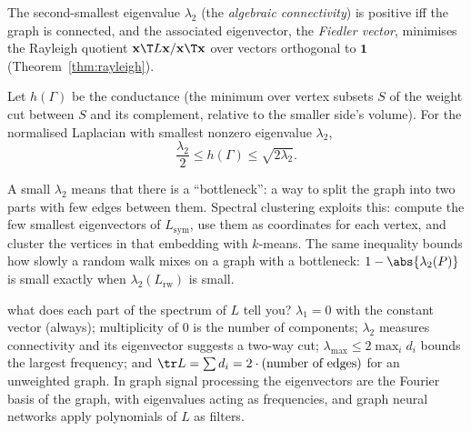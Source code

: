 The second-smallest eigenvalue $\lambda_2$ (the \emph{algebraic connectivity}) is positive iff the graph is connected, and the associated eigenvector, the \emph{Fiedler vector}, minimises the Rayleigh quotient $\mathbf{x}\T L\mathbf{x}/\mathbf{x}\T\mathbf{x}$ over vectors orthogonal to $\mathbf{1}$ (Theorem~\ref{thm:rayleigh}).

\begin{theorem}\label{thm:cheeger}
Let $h(\Gamma)$ be the conductance (the minimum over vertex subsets $S$ of the weight cut between $S$ and its complement, relative to the smaller side's volume). For the normalised Laplacian with smallest nonzero eigenvalue $\lambda_2$,
\[ \frac{\lambda_2}2\le h(\Gamma)\le\sqrt{2\lambda_2}. \]
\end{theorem}

\begin{intuition}
A small $\lambda_2$ means that there is a ``bottleneck'': a way to split the graph into two parts with few edges between them. Spectral clustering exploits this: compute the few smallest eigenvectors of $L_{\mathrm{sym}}$, use them as coordinates for each vertex, and cluster the vertices in that embedding with $k$-means. The same inequality bounds how slowly a random walk mixes on a graph with a bottleneck: $1-\abs{\lambda_2(P)}$ is small exactly when $\lambda_2(L_{\mathrm{rw}})$ is small.
\end{intuition}

\begin{interview}{what does each part of the spectrum of $L$ tell you?}
$\lambda_1=0$ with the constant vector (always); multiplicity of $0$ is the number of components; $\lambda_2$ measures connectivity and its eigenvector suggests a two-way cut; $\lambda_{\max}\le2\max_id_i$ bounds the largest frequency; and $\tr L=\sum d_i=2\cdot(\text{number of edges})$ for an unweighted graph. In graph signal processing the eigenvectors are the Fourier basis of the graph, with eigenvalues acting as frequencies, and graph neural networks apply polynomials of $L$ as filters.
\end{interview}

